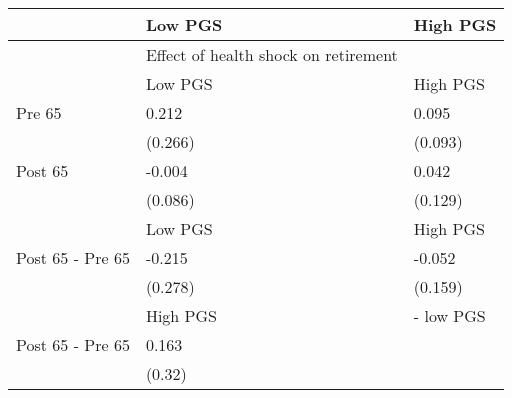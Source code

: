 % 
\begin{tabular}{lll}
  \hline
 & Low PGS & High PGS \\ 
  \hline
 & Effect of health shock on retirement &  \\ 
   & Low PGS & High PGS \\ 
  Pre 65 & 0.212 & 0.095 \\ 
   & (0.266) & (0.093) \\ 
  Post 65 & -0.004 & 0.042 \\ 
   & (0.086) & (0.129) \\ 
   & Low PGS & High PGS \\ 
  Post 65 - Pre 65 & -0.215 & -0.052 \\ 
   & (0.278) & (0.159) \\ 
   & High PGS  & - low PGS \\ 
  Post 65 - Pre 65 & 0.163 &  \\ 
   & (0.32) &  \\ 
   \hline
\end{tabular}
